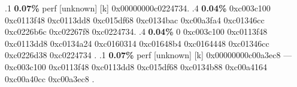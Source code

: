 \begin{profile}
{.1 \textbf{ 0.07\%} perf             [unknown]              [k] 0x00000000c0224734. 
.4 \textbf{0.04\%} 0xc003c100\newline {} 0xc0113f48\newline {} 0xc0113dd8\newline {} 0xc015df68\newline {} 0xc0134bac\newline {} 0xc00a3fa4\newline {} 0xc01346cc\newline {} 0xc0226b6c\newline {} 0xc02267f8\newline {} 0xc0224734. 
.4 \textbf{0.04\%} 0\newline {} 0xc003c100\newline {} 0xc0113f48\newline {} 0xc0113dd8\newline {} 0xc0134a24\newline {} 0xc0160314\newline {} 0xc01648b4\newline {} 0xc0164448\newline {} 0xc01346cc\newline {} 0xc0226d38\newline {} 0xc0224734\newline {} . 
.1 \textbf{ 0.07\%} perf             [unknown]              [k] 0x00000000c00a3ec8\newline {} ---0xc003c100\newline {} 0xc0113f48\newline {} 0xc0113dd8\newline {} 0xc015df68\newline {} 0xc0134b88\newline {} 0xc00a4164\newline {} 0xc00a40cc\newline {} 0xc00a3ec8\newline {} . 
}
\end{profile}
